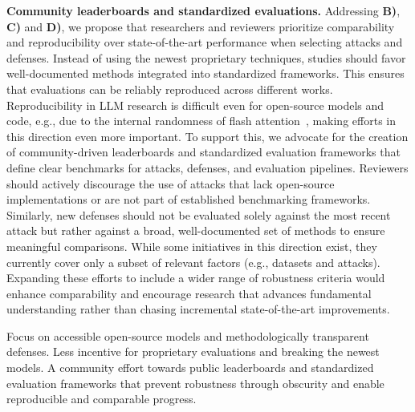 

\textbf{Community leaderboards and standardized evaluations.} Addressing \textbf{B)}, \textbf{C)} and \textbf{D)}, we propose that researchers and reviewers prioritize comparability and reproducibility over state-of-the-art performance when selecting attacks and defenses. Instead of using the newest proprietary techniques, studies should favor well-documented methods integrated into standardized frameworks. This ensures that evaluations can be reliably reproduced across different works. Reproducibility in LLM research is difficult even for open-source models and code, e.g., due to the internal randomness of flash attention~\cite{maini2024tofu}, making efforts in this direction even more important. To support this, we advocate for the creation of community-driven leaderboards and standardized evaluation frameworks that define clear benchmarks for attacks, defenses, and evaluation pipelines. Reviewers should actively discourage the use of attacks that lack open-source implementations or are not part of established benchmarking frameworks. Similarly, new defenses should not be evaluated solely against the most recent attack but rather against a broad, well-documented set of methods to ensure meaningful comparisons. While some initiatives in this direction exist, they currently cover only a subset of relevant factors (e.g., datasets and attacks). Expanding these efforts to include a wider range of robustness criteria would enhance comparability and encourage research that advances fundamental understanding rather than chasing incremental state-of-the-art improvements.
\begin{tcolorbox}[
    colback=white, colframe=purple!80!black, coltitle=white, fonttitle=\bfseries, 
    rounded corners, enhanced, 
    title=Key Takeaways, 
    attach boxed title to top left={yshift=-2mm, xshift=5mm}, 
    boxed title style={colback=purple!80!black, rounded corners},
    boxsep=0.5mm,
    left=2mm, %
    right=2mm
]
Focus on accessible open-source models and methodologically transparent defenses. Less incentive for proprietary evaluations and breaking the newest models. A community effort towards public leaderboards and standardized evaluation frameworks that prevent robustness through obscurity and enable reproducible and comparable progress.
\end{tcolorbox}

